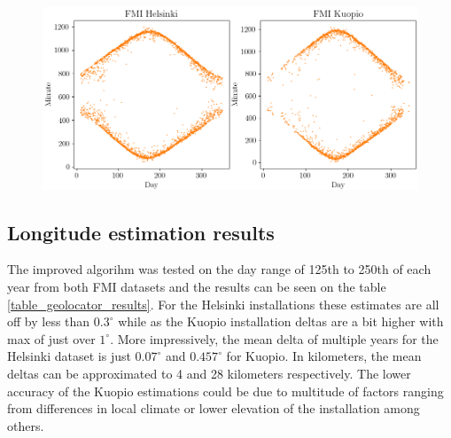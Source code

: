 

\begin{figure}[ht!]
\centering
\includegraphics[width=1\linewidth]{pics/first_last_helsinki_kuopio2}
\label{fig_first_last_kuopio_helsinki}
\end{figure}



\subsection{Longitude estimation results}
The improved algorihm was tested on the day range of 125th to 250th of each year from both FMI datasets and the results can be seen on the table \ref{table_geolocator_results}. For the Helsinki installations these estimates are all off by less than $0.3^\circ$ while as the Kuopio installation deltas are a bit higher with max of just over $1^\circ$. More impressively, the mean delta of multiple years for the Helsinki dataset is just $0.07^\circ$ and $0.457^\circ$ for Kuopio. In kilometers, the mean deltas can be approximated to 4 and 28 kilometers respectively. The lower accuracy of the Kuopio estimations could be due to multitude of factors ranging from differences in local climate or lower elevation of the installation among others. 




